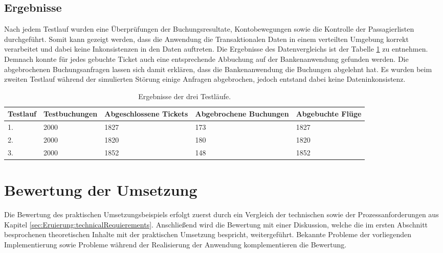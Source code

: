 \subsection{Ergebnisse}
\label{subsec:evaluation:resultsTestRuns}
Nach jedem Testlauf wurden eine Überprüfungen der Buchungsresultate, Kontobewegungen sowie die Kontrolle der Passagierlisten durchgeführt. Somit kann gezeigt werden, dass die Anwendung die Transaktionalen Daten in einem verteilten Umgebung korrekt verarbeitet und dabei keine Inkonsistenzen in den Daten auftreten. Die Ergebnisse des Datenvergleichs ist der Tabelle \ref{tab:evaluation:resultsTestRuns} zu entnehmen. Demnach konnte für jedes gebuchte Ticket auch eine entsprechende Abbuchung auf der Bankenanwendung gefunden werden. Die abgebrochenen Buchungsanfragen lassen sich damit erklären, dass die Bankenanwendung die Buchungen abgelehnt hat. Es wurden beim zweiten Testlauf während der simulierten Störung einige Anfragen abgebrochen, jedoch entstand dabei keine Dateninkonsistenz.
\begin{table}
    \centering
    \begin{tabular}{p{1.5 cm} p{2.5 cm} p{2.5 cm} p{2.5 cm} p{2.5 cm}}
        Testlauf    & Testbuchungen       &   Abgeschlossene Tickets & Abgebrochene Buchungen & Abgebuchte Flüge  \\ \hline
            1.      & 2000                &         1827             &      173               &         1827        \\
            2.      & 2000                &         1820             &      180               &         1820        \\
            3.      & 2000                &         1852             &      148               &         1852        
    \end{tabular}
    \caption{Ergebnisse der drei Testläufe.}
    \label{tab:evaluation:resultsTestRuns}
\end{table}

\section{Bewertung der Umsetzung}
\label{cha:rating}
Die Bewertung des praktischen Umsetzungsbeispiels erfolgt zuerst durch ein Vergleich der technischen sowie der Prozessanforderungen aus Kapitel \ref{sec:Eruierung:technicalRequierements}. Anschließend wird die Bewertung mit einer Diskussion, welche die im ersten Abschnitt besprochenen theoretischen Inhalte mit der praktischen Umsetzung bespricht, weitergeführt. Bekannte Probleme der vorliegenden Implementierung sowie Probleme während der Realisierung der Anwendung komplementieren die Bewertung.

